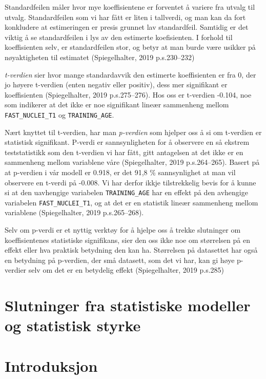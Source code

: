 \documentclass[
  letterpaper,
  DIV=11,
  numbers=noendperiod]{scrreprt}
\begin{document}
Standardfeilen måler hvor mye koeffisientene er forventet å variere fra
utvalg til utvalg. Standardfeilen som vi har fått er liten i tallverdi,
og man kan da fort konkludere at estimeringen er presis grunnet lav
standardfeil. Samtidig er det viktig å se standardfeilen i lys av den
estimerte koefisienten. I forhold til koeffisienten selv, er
standardfeilen stor, og betyr at man burde være usikker på nøyaktigheten
til estimatet (Spiegelhalter, 2019 p.s.230--232)

\emph{t-verdien} sier hvor mange standardavvik den estimerte
koeffisienten er fra 0, der jo høyere t-verdien (enten negativ eller
positiv), dess mer signifikant er koeffisienten (Spiegelhalter, 2019
p.s.275--276). Hos oss er t-verdien -0.104, noe som indikerer at det
ikke er noe signifikant lineær sammenheng mellom
\texttt{FAST\_NUCLEI\_T1} og \texttt{TRAINING\_AGE}.

Nært knyttet til t-verdien, har man \emph{p-verdien} som hjelper oss å
si om t-verdien er statistisk signifikant. P-verdi er sannsynligheten
for å observere en så ekstrem teststatistikk som den t-verdien vi har
fått, gitt antagelsen at det ikke er en sammenheng mellom variablene
våre (Spiegelhalter, 2019 p.s.264--265). Basert på at p-verdien i vår
modell er 0.918, er det 91,8 \% sannsynlighet at man vil observere en
t-verdi på -0.008. Vi har derfor ikkje tilstrekkelig bevis for å kunne
si at den uavhengige variabelen \texttt{TRAINING\_AGE} har en effekt på
den avhengige variabelen \texttt{FAST\_NUCLEI\_T1}, og at det er en
statistik lineær sammenheng mellom variablene (Spiegelhalter, 2019
p.s.265--268).

Selv om p-verdi er et nyttig verktøy for å hjelpe oss å trekke
slutninger om koeffisientenes statistiske signifikans, sier den oss ikke
noe om størrelsen på en effekt eller hva praktisk betydning den kan ha.
Størrelsen på datasettet har også en betydning på p-verdien, der små
datasett, som det vi har, kan gi høye p-verdier selv om det er en
betydelig effekt (Spiegelhalter, 2019 p.s.285)


\chapter{Slutninger fra statistiske modeller og statistisk
styrke}\label{slutninger-fra-statistiske-modeller-og-statistisk-styrke}


\chapter{Introduksjon}\label{introduksjon-4}
\end{document}
